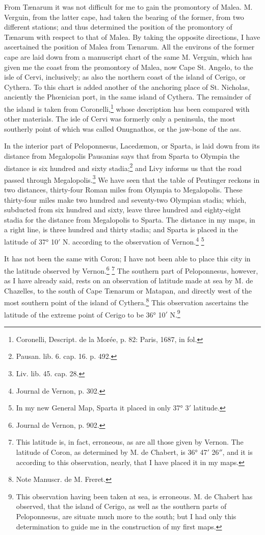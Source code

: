 \documentclass[a4paper, 11pt, oneside, polutonikogreek, english]{article}
\begin{document}
From Tænarum it was not difficult for me to gain the promontory of Malea. M. Verguin, from the latter cape, had taken the bearing of the former, from two different stations; and thus determined the position of the promontory of Tænarum with respect to that of Malea. By taking the opposite directions, I have ascertained the position of Malea from Tænarum. All the environs of the former cape are laid down from a manuscript chart of the same M. Verguin, which has given me the coast from the promontory of Malea, now Cape St. Angelo, to the isle of Cervi, inclusively; as also the northern coast of the island of Cerigo, or Cythera. To this chart is added another of the anchoring place of St. Nicholas, anciently the Phœnician port, in the same island of Cythera. The remainder of the island is taken from Coronelli,\footnote{Coronelli, Descript. de la Morée, p. 82: Paris, 1687, in fol.} whose description has been compared with other materials. The isle of Cervi was formerly only a peninsula, the most southerly point of which was called Onugnathos, or the jaw-bone of the ass.

In the interior part of Peloponnesus, Lacedæmon, or Sparta, is laid down from its distance from Megalopolis Pausanias says that from Sparta to Olympia the distance is six hundred and sixty stadia;\footnote{Pausan. lib. 6. cap. 16. p. 492.} and Livy informs us that the road passed through Megalopolis.\footnote{Liv. lib. 45. cap. 28.} We have seen that the table of Peutinger reckons in two distances, thirty-four Roman miles from Olympia to Megalopolis. These thirty-four miles make two hundred and seventy-two Olympian stadia; which, subducted from six hundred and sixty, leave three hundred and eighty-eight stadia for the distance from Megalopolis to Sparta. The distance in my maps, in a right line, is three hundred and thirty stadia; and Sparta is placed in the latitude of 37° 10$'$ N. according to the observation of Vernon.\footnote{Journal de Vernon, p. 302.} \footnote{In my new General Map, Sparta it placed in only 37° 3$'$ latitude.}

It has not been the same with Coron; I have not been able to place this city in the latitude observed by Vernon.\footnote{Journal de Vernon, p. 902.} \footnote{This latitude is, in fact, erroneous, as are all those given by Vernon. The latitude of Coron, as determined by M. de Chabert, is 36° 47$'$ 26$''$, and it is according to this observation, nearly, that I have placed it in my maps.} The southern part of Peloponnesus, however, as I have already said, rests on an observation of latitude made at sea by M. de Chazelles, to the south of Cape Tænarum or Matapan, and directly west of the most southern point of the island of Cythera.\footnote{Note Manuscr. de M. Freret.} This observation ascertains the latitude of the extreme point of Cerigo to be 36° 10$'$ N.\footnote{This observation having been taken at sea, is erroneous. M. de Chabert has observed, that the island of Cerigo, as well as the southern parts of Peloponnesus, are situate much more to the south; but I had only this determination to guide me in the construction of my first maps.}
\end{document}
